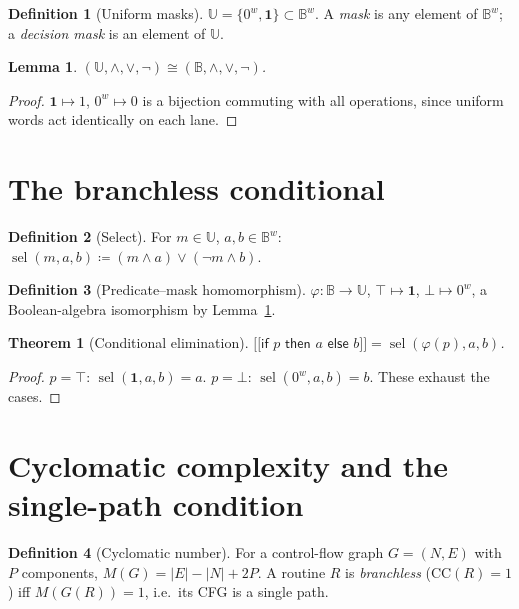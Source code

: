 \documentclass[11pt,oneside]{book}
\theoremstyle{definition}
\newtheorem{definition}{Definition}[chapter]
\theoremstyle{plain}
\newtheorem{theorem}{Theorem}[chapter]
\newtheorem{lemma}{Lemma}[chapter]
\theoremstyle{remark}
\newcommand{\Bits}{\mathbb{B}}
\newcommand{\Word}[1]{\Bits^{#1}}
\newcommand{\Unif}{\mathbb{U}}
\newcommand{\sel}{\operatorname{sel}}
\newcommand{\phimap}{\varphi}
\newcommand{\llbracket}{\mathopen{[\![}}
\newcommand{\rrbracket}{\mathclose{]\!]}}
\begin{document}
\begin{definition}[Uniform masks]
$\Unif=\{0^w,\mathbf{1}\}\subset\Word{w}$. A \emph{mask} is any element of $\Word{w}$; a
\emph{decision mask} is an element of $\Unif$.
\end{definition}

\begin{lemma}\label{lem:Uiso}
$(\Unif,\wedge,\vee,\neg)\cong(\Bits,\wedge,\vee,\neg)$.
\end{lemma}
\begin{proof}
$\mathbf{1}\mapsto1$, $0^w\mapsto0$ is a bijection commuting with all operations, since
uniform words act identically on each lane.
\end{proof}

\section{The branchless conditional}
\begin{definition}[Select]
For $m\in\Unif$, $a,b\in\Word{w}$: $\sel(m,a,b)\coloneqq(m\wedge a)\vee(\neg m\wedge b)$.
\end{definition}

\begin{definition}[Predicate--mask homomorphism]
$\phimap:\Bits\to\Unif$, $\top\mapsto\mathbf{1}$, $\bot\mapsto0^w$, a Boolean-algebra
isomorphism by Lemma~\ref{lem:Uiso}.
\end{definition}

\begin{theorem}[Conditional elimination]\label{thm:cond}
$\llbracket\textsf{if }p\textsf{ then }a\textsf{ else }b\rrbracket=\sel(\phimap(p),a,b)$.
\end{theorem}
\begin{proof}
$p=\top$: $\sel(\mathbf{1},a,b)=a$. $p=\bot$: $\sel(0^w,a,b)=b$. These exhaust the cases.
\end{proof}

\section{Cyclomatic complexity and the single-path condition}
\begin{definition}[Cyclomatic number]
For a control-flow graph $G=(N,E)$ with $P$ components, $M(G)=|E|-|N|+2P$. A routine $R$ is
\emph{branchless} ($\mathrm{CC}(R)=1$) iff $M(G(R))=1$, i.e.\ its CFG is a single path.
\end{definition}
\end{document}
